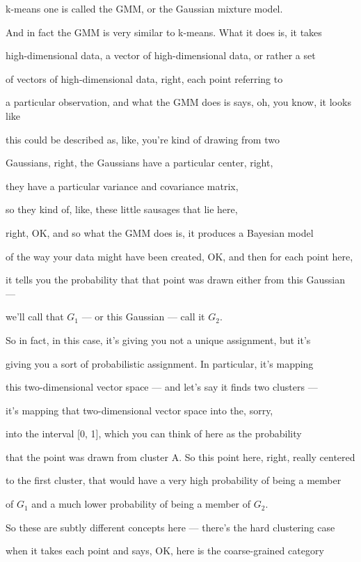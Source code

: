 \documentclass[]{article}
\begin{document}
k-means one is called the GMM,
or the Gaussian mixture model.

And in fact the GMM is very similar
to k-means. What it does is, it takes

high-dimensional data, a vector of
high-dimensional data, or rather a set

of vectors of high-dimensional data,
right, each point referring to

a particular observation, and what the GMM
does is says, oh, you know, it looks like

this could be described as, like,
you're kind of drawing from two

Gaussians, right, the Gaussians
have a particular center, right,

they have a particular variance
and covariance matrix,

so they kind of, like,
these little sausages that lie here,

right, OK, and so what the GMM does is,
it produces a Bayesian model

of the way your data might have been
created, OK, and then for each point here,

it tells you the probability that that point
was drawn either from this Gaussian ---

we'll call that $G_1$ --- or this
Gaussian --- call it $G_2$.

So in fact, in this case, it's giving you
not a unique assignment, but it's

giving you a sort of probabilistic
assignment. In particular, it's mapping

this two-dimensional vector space ---
and let's say it finds two clusters ---

it's mapping that two-dimensional
vector space into the, sorry,

into the interval [0, 1], which you can
think of here as the probability

that the point was drawn from cluster A.
So this point here, right, really centered

to the first cluster, that would have a
very high probability of being a member

of $G_1$ and a much lower probability of
being a member of $G_2$.

So these are subtly different concepts
here --- there's the hard clustering case

when it takes each point and says, OK,
here is the coarse-grained category
\end{document}
